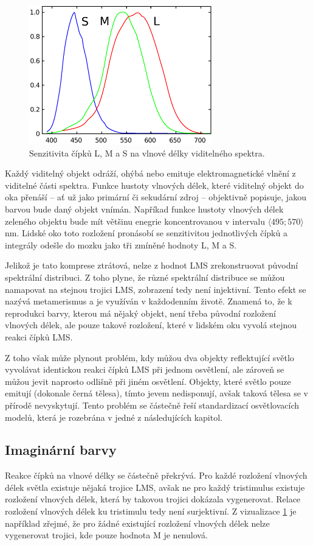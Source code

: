 \documentclass[a4paper, 12pt, titlepage]{article}
\begin{document}
  \begin{figure}[h!]
	\centering
	\includegraphics[width=8cm]{Cones_SMJ2_E.pdf}
	\caption{Senzitivita čípků L, M a S na vlnové délky viditelného spektra.}
	\label{fig:cones}
	\end{figure}

  Každý viditelný objekt odráží, ohýbá nebo emituje elektromagnetické vlnění z viditelné části spektra.
  Funkce hustoty vlnových délek, které viditelný objekt do oka přenáší -- ať už jako primární či sekudární zdroj -- objektivně popisuje, jakou barvou bude daný objekt vnímán.
  Napříkad funkce hustoty vlnových délek zeleného objektu bude mít většinu enegrie koncentrovanou v intervalu $\langle495; 570 \rangle$ nm.
  Lidské oko toto rozložení pronásobí se senzitivitou jednotlivých čípků a integrály odešle do mozku jako tři zmíněné hodnoty L, M a S.

  Jelikož je tato komprese ztrátová, nelze z hodnot LMS zrekonstruovat původní spektrální distribuci.
  Z toho plyne, že různé spektrální distribuce se můžou namapovat na stejnou trojici LMS, zobrazení tedy není injektivní.
  Tento efekt se nazývá metamerismus a je využíván v každodenním životě.
  Znamená to, že k reprodukci barvy, kterou má nějaký objekt, není třeba původní rozložení vlnových délek, ale pouze takové rozložení, které v lidském oku vyvolá stejnou reakci čípků LMS. \cite{Abraham2016}

  Z toho však může plynout problém, kdy můžou dva objekty reflektující světlo vyvolávat identickou reakci čípků LMS při jednom osvětlení, ale zároveň se můžou jevit naprosto odlišně při jiném osvětlení.
  Objekty, které světlo pouze emitují (dokonale černá tělesa), tímto jevem nedisponují, avšak taková tělesa se v přírodě nevyskytují.
  Tento problém se částečně řeší standardizací osvětlovacích modelů, která je rozebrána v jedné z následujících kapitol.

  \subsection{Imaginární barvy}
  Reakce čípků na vlnové délky se částečně překrývá.
  Pro každé rozložení vlnových délek světla existuje nějaká trojice LMS,
  avšak ne pro každý tristimulus existuje rozložení vlnových délek, která by takovou trojici dokázala vygenerovat.
  Relace rozložení vlnových délek ku tristimulu tedy není surjektivní.
  Z vizualizace \ref{fig:cones} je například zřejmé, že pro žádné existující rozložení vlnových délek nelze vygenerovat trojici, kde pouze hodnota M je nenulová. \cite{VincentA}
\end{document}
